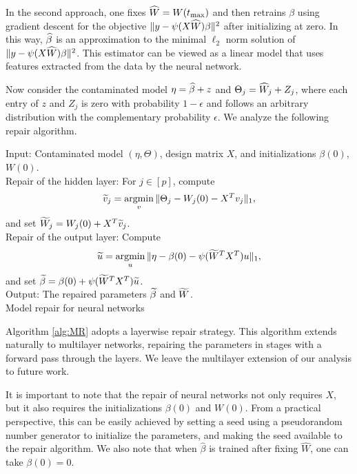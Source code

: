 In the second approach, one fixes $\widehat{W} = W(t_{\max})$ and then retrains $\beta$
using gradient descent for the objective $\|y-\psi(X\widehat{W})\beta\|^2$ after initializing at zero.
In this way, $\widehat{\beta}$ is an approximation to the minimal $\ell_2$ norm solution of $\|y-\psi(X\widehat{W})\beta\|^2$.
This estimator can be viewed as a linear model that uses features extracted from the data by the neural network.

Now consider the contaminated model $\eta=\widehat{\beta}+z$ and $\Theta_j=\widehat{W}_j+Z_j$, where each entry of $z$ and $Z_j$ is zero with probability $1-\epsilon$ and follows an arbitrary distribution with the complementary probability $\epsilon$. We analyze the following repair algorithm.

\vskip10pt
\begin{algorithm}[H]
\DontPrintSemicolon
\vskip5pt
\nl Input: Contaminated model $(\eta,\Theta)$, design matrix $X$, and initializations $\beta(0)$, $W(0)$. \\[3pt]
\nl Repair of the hidden layer: For $j\in[p]$, compute
$$\widetilde{v}_j=\mathop{\rm argmin}_v\|\Theta_j-W_j(0)-X^Tv_j\|_1,$$
and set $\widetilde{W}_j=W_j(0)+X^T\widetilde{v}_j$. \\[8pt]
\nl Repair of the output layer: Compute
$$\widetilde{u}=\mathop{\rm argmin}_u\|\eta-\beta(0)-\psi(\widetilde{W}^TX^T)u\|_1,$$
and set $\widetilde{\beta}=\beta(0)+\psi(\widetilde{W}^TX^T)\widetilde{u}$. \\[3pt]
\nl Output: The repaired parameters $\widetilde{\beta}$ and $\widetilde{W}$. \\[5pt]
\caption{Model repair for neural networks}\label{alg:MR}
\end{algorithm}
\vskip10pt

\begin{remark}
Algorithm \ref{alg:MR} adopts a layerwise repair strategy. This algorithm extends naturally to multilayer networks, repairing the parameters in stages with a forward pass through the layers. We leave the multilayer extension of our analysis to future work.
\end{remark}

\begin{remark}
It is important to note that the repair of neural networks not only requires $X$, but it also
requires the initializations $\beta(0)$ and $W(0)$. From a practical
perspective, this can be easily achieved by setting a seed using a pseudorandom number generator to initialize the
parameters, and making the seed available to the repair algorithm. We also note that when $\hat\beta$ is
trained after fixing $\hat W$, one can take $\beta(0)=0$.
\end{remark}

